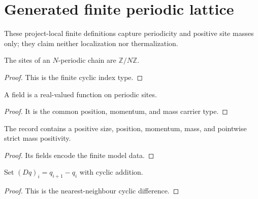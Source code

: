 
\chapter{Generated finite periodic lattice}
\label{ch:ArchonPhysics_Generated_problem_finite_periodic}

These project-local finite definitions capture periodicity and positive site masses only; they claim neither localization nor thermalization.

\begin{definition}
\label{def:finite-periodic:site}
The sites of an $N$-periodic chain are $\mathbb Z/N\mathbb Z$.
\end{definition}
\begin{proof}This is the finite cyclic index type.\end{proof}

\begin{definition}
\label{def:finite-periodic:field}
A field is a real-valued function on periodic sites.
\end{definition}
\begin{proof}It is the common position, momentum, and mass carrier type.\end{proof}

\begin{definition}
\label{def:finite-periodic:lattice}
The record contains a positive size, position, momentum, mass, and pointwise strict mass positivity.
\end{definition}
\begin{proof}Its fields encode the finite model data.\end{proof}

\begin{definition}
\label{def:finite-periodic:forward-difference}
Set $(Dq)_i=q_{i+1}-q_i$ with cyclic addition.
\end{definition}
\begin{proof}This is the nearest-neighbour cyclic difference.\end{proof}

